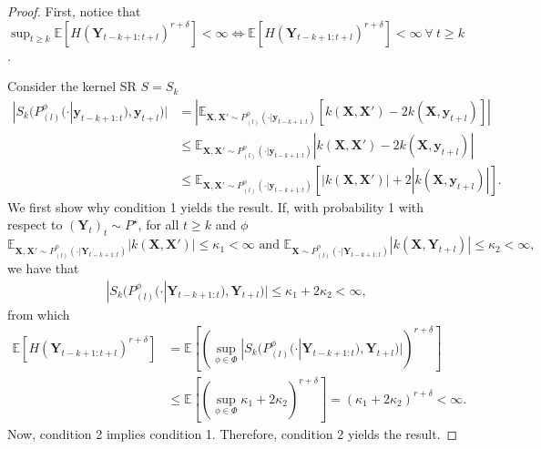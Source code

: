 \documentclass[twoside,11pt]{article}
\newcommand{\E}{\mathbb{E}}
\newcommand{\ddobs}{\mathbf{y}}
\newcommand{\Ddsim}{\mathbf{X}}
\newcommand{\Ddobs}{\mathbf{Y}}
\begin{document}
	\begin{proof}
		First, notice that $ \sup_{t\ge k} \E\left[H(\Ddobs_{t-k+1:t+l})^{r+\delta}\right] <\infty \iff \E\left[H(\Ddobs_{t-k+1:t+l})^{r+\delta}\right] <\infty\ \forall \ t\ge k $.
		
		
		Consider the kernel SR $ S=S_k $ 
		\begin{equation}\label{Eq:kernel_SR_bounded}
		\begin{aligned}
		|S_k(P^\phi_{(l)}(\cdot|\ddobs_{t-k+1:t}), \ddobs_{t+l})| &= |\E_{\Ddsim,\Ddsim'\sim P^\phi_{(l)}(\cdot|\ddobs_{t-k+1:t})}[k(\Ddsim,\Ddsim') - 2k(\Ddsim, \ddobs_{t+l})]|\\
		&\le \E_{\Ddsim,\Ddsim'\sim P^\phi_{(l)}(\cdot|\ddobs_{t-k+1:t})}|k(\Ddsim,\Ddsim') - 2k(\Ddsim, \ddobs_{t+l})|\\
		&\le \E_{\Ddsim,\Ddsim'\sim P^\phi_{(l)}(\cdot|\ddobs_{t-k+1:t})}[|k(\Ddsim,\Ddsim')| + 2|k(\Ddsim, \ddobs_{t+l})|].
		\end{aligned}
		\end{equation}
		We first show why condition 1 yields the result. If, with probability 1 with respect to $ (\Ddobs_t)_t\sim P^\star $, for all $ t\ge k $ and $ \phi $ \begin{equation}\label{Eq:kernel_condition_1}
		\E_{\Ddsim,\Ddsim'\sim P^\phi_{(l)}(\cdot|\Ddobs_{t-k+1:t})}|k(\Ddsim,\Ddsim')|\le \kappa_1<\infty  \text{   and    } \E_{\Ddsim\sim P^\phi_{(l)}(\cdot|\Ddobs_{t-k+1:t})}|k(\Ddsim,\Ddobs_{t+l})|\le \kappa_2<\infty, 
		\end{equation}we have that
		\begin{equation}\label{}
		\begin{aligned}
		|S_k(P^\phi_{(l)}(\cdot|\Ddobs_{t-k+1:t}), \Ddobs_{t+l})|\le \kappa_1 + 2\kappa_2<\infty,
		\end{aligned}
		\end{equation}
		from which
		\begin{equation}\label{key}
		\begin{aligned}
		\E\left[H(\Ddobs_{t-k+1:t+l})^{r+\delta}\right] &= \E\left[\left( \sup_{\phi \in \Phi } |S_k(P^\phi_{(l)}(\cdot|\Ddobs_{t-k+1:t}), \Ddobs_{t+l})| \right)^{r+\delta}\right]\\
		&\le \E\left[\left( \sup_{\phi \in \Phi } \kappa_1 + 2\kappa_2 \right)^{r+\delta}\right] = \left(\kappa_1 + 2\kappa_2\right)^{r+\delta}<\infty.
		\end{aligned}
		\end{equation}
		Now, condition 2 implies condition 1. Therefore, condition 2 yields the result.
	\end{proof}
	
\end{document}
